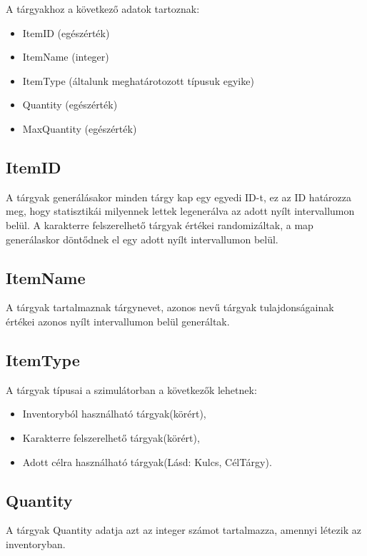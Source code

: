 
A tárgyakhoz a következő adatok tartoznak:
\begin{itemize}
    \item ItemID (egészérték)
    \item ItemName (integer)
    \item ItemType (általunk meghatárotozott típusuk egyike)
    \item Quantity (egészérték)
    \item MaxQuantity (egészérték)
\end{itemize}

\subsection{ItemID}

A tárgyak generálásakor minden tárgy kap egy egyedi ID-t, ez az ID határozza meg, hogy statisztikái milyennek lettek legenerálva az adott nyílt intervallumon belül.
A karakterre felszerelhető tárgyak értékei randomizáltak, a map generálaskor döntődnek el egy adott nyílt intervallumon belül.

\subsection{ItemName}

A tárgyak tartalmaznak tárgynevet, azonos nevű tárgyak tulajdonságainak értékei azonos nyílt intervallumon belül generáltak.

\subsection{ItemType}

A tárgyak típusai a szimulátorban a következők lehetnek:
\begin{itemize}
    \item Inventoryból használható tárgyak(körért),
    \item Karakterre felszerelhető tárgyak(körért),
    \item Adott célra használható tárgyak(Lásd: Kulcs, CélTárgy).
\end{itemize}

\subsection{Quantity}

A tárgyak Quantity adatja azt az integer számot tartalmazza, amennyi létezik az inventoryban.

